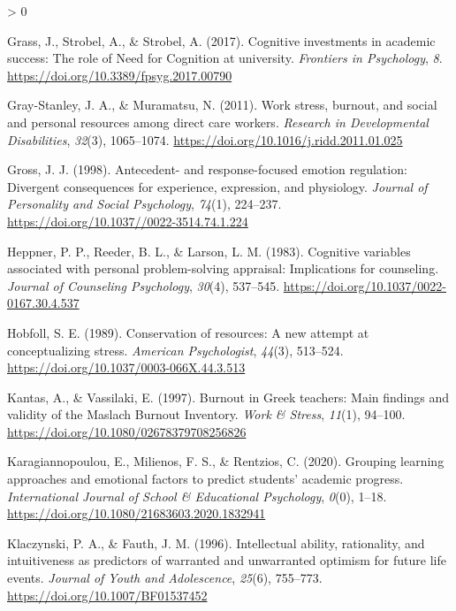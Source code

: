 \documentclass[
  english,
  man]{apa6}
\newlength{\cslhangindent}
\newenvironment{CSLReferences}[2] %
 {%
  \setlength{\parindent}{0pt}
  \ifodd #1 \everypar{\setlength{\hangindent}{\cslhangindent}}\ignorespaces\fi
  \ifnum #2 > 0
  \setlength{\parskip}{#2\baselineskip}
  \fi
 }%
 {}
\begin{document}
\begin{CSLReferences}{1}{0}
\leavevmode\hypertarget{ref-Grass2017}{}%
Grass, J., Strobel, A., \& Strobel, A. (2017). Cognitive investments in academic success: {The} role of {Need} for {Cognition} at university. \emph{Frontiers in Psychology}, \emph{8}. \url{https://doi.org/10.3389/fpsyg.2017.00790}

\leavevmode\hypertarget{ref-GrayStanley2011}{}%
Gray-Stanley, J. A., \& Muramatsu, N. (2011). Work stress, burnout, and social and personal resources among direct care workers. \emph{Research in Developmental Disabilities}, \emph{32}(3), 1065--1074. \url{https://doi.org/10.1016/j.ridd.2011.01.025}

\leavevmode\hypertarget{ref-Gross1998a}{}%
Gross, J. J. (1998). Antecedent- and response-focused emotion regulation: {Divergent} consequences for experience, expression, and physiology. \emph{Journal of Personality and Social Psychology}, \emph{74}(1), 224--237. \url{https://doi.org/10.1037//0022-3514.74.1.224}

\leavevmode\hypertarget{ref-Heppner1983}{}%
Heppner, P. P., Reeder, B. L., \& Larson, L. M. (1983). Cognitive variables associated with personal problem-solving appraisal: {Implications} for counseling. \emph{Journal of Counseling Psychology}, \emph{30}(4), 537--545. \url{https://doi.org/10.1037/0022-0167.30.4.537}

\leavevmode\hypertarget{ref-Hobfoll1989}{}%
Hobfoll, S. E. (1989). Conservation of resources: {A} new attempt at conceptualizing stress. \emph{American Psychologist}, \emph{44}(3), 513--524. \url{https://doi.org/10.1037/0003-066X.44.3.513}

\leavevmode\hypertarget{ref-Kantas1997}{}%
Kantas, A., \& Vassilaki, E. (1997). Burnout in {Greek} teachers: {Main} findings and validity of the {Maslach} {Burnout} {Inventory}. \emph{Work \& Stress}, \emph{11}(1), 94--100. \url{https://doi.org/10.1080/02678379708256826}

\leavevmode\hypertarget{ref-Karagiannopoulou2020}{}%
Karagiannopoulou, E., Milienos, F. S., \& Rentzios, C. (2020). Grouping learning approaches and emotional factors to predict students' academic progress. \emph{International Journal of School \& Educational Psychology}, \emph{0}(0), 1--18. \url{https://doi.org/10.1080/21683603.2020.1832941}

\leavevmode\hypertarget{ref-Klaczynski1996}{}%
Klaczynski, P. A., \& Fauth, J. M. (1996). Intellectual ability, rationality, and intuitiveness as predictors of warranted and unwarranted optimism for future life events. \emph{Journal of Youth and Adolescence}, \emph{25}(6), 755--773. \url{https://doi.org/10.1007/BF01537452}


\end{CSLReferences}
\end{document}
